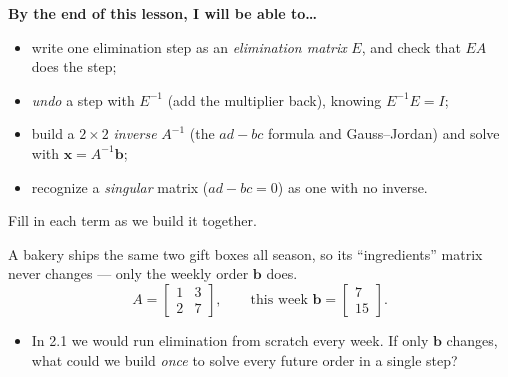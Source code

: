 \documentclass[10pt]{article}
\newcommand{\xx}{\mathbf{x}}
\newcommand{\bb}{\mathbf{b}}
\begin{document}

\vspace{0.12in}

\begin{objectivebox}
\textbf{By the end of this lesson, I will be able to\dots}
\begin{itemize}\setlength{\itemsep}{2pt}
  \item write one elimination step as an \emph{elimination matrix} $E$, and check that $EA$ does the step;
  \item \emph{undo} a step with $E^{-1}$ (add the multiplier back), knowing $E^{-1}E=I$;
  \item build a $2\times2$ \emph{inverse} $A^{-1}$ (the $ad-bc$ formula and Gauss--Jordan) and solve with $\xx=A^{-1}\bb$;
  \item recognize a \emph{singular} matrix ($ad-bc=0$) as one with no inverse.
\end{itemize}
\end{objectivebox}

\vspace{0.10in}

\begin{vocabbox}
\small
Fill in each term as we build it together.
\par\vspace{2pt}
\end{vocabbox}

\begin{hookbox}
A bakery ships the same two gift boxes all season, so its ``ingredients'' matrix never changes ---
only the weekly order $\bb$ does.
\[
  A = \begin{bmatrix} 1 & 3 \\ 2 & 7 \end{bmatrix}, \qquad
  \text{this week } \bb = \begin{bmatrix} 7 \\ 15 \end{bmatrix}.
\]
\begin{itemize}\setlength{\itemsep}{1pt}
  \item In 2.1 we would run elimination from scratch every week. If only $\bb$ changes, what could
        we build \emph{once} to solve every future order in a single step? \writeline
\end{itemize}
\end{hookbox}
\end{document}
